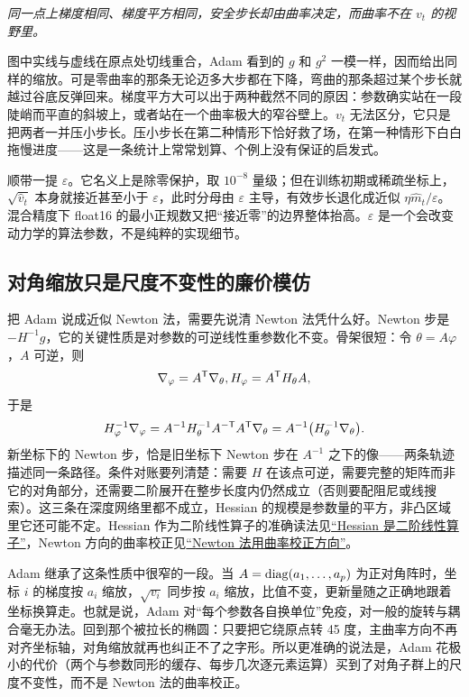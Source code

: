 \emph{同一点上梯度相同、梯度平方相同，安全步长却由曲率决定，而曲率不在 \(v_t\) 的视野里。}

图中实线与虚线在原点处切线重合，Adam 看到的 \(g\) 和 \(g^2\) 一模一样，因而给出同样的缩放。可是零曲率的那条无论迈多大步都在下降，弯曲的那条超过某个步长就越过谷底反弹回来。梯度平方大可以出于两种截然不同的原因：参数确实站在一段陡峭而平直的斜坡上，或者站在一个曲率极大的窄谷壁上。\(v_t\) 无法区分，它只是把两者一并压小步长。压小步长在第二种情形下恰好救了场，在第一种情形下白白拖慢进度——这是一条统计上常常划算、个例上没有保证的启发式。

顺带一提 \(\varepsilon\)。它名义上是除零保护，取 \(10^{-8}\) 量级；但在训练初期或稀疏坐标上，\(\sqrt{\widehat v_t}\) 本身就接近甚至小于 \(\varepsilon\)，此时分母由 \(\varepsilon\) 主导，有效步长退化成近似 \(\eta\widehat m_t/\varepsilon\)。混合精度下 float16 的最小正规数又把``接近零''的边界整体抬高。\(\varepsilon\) 是一个会改变动力学的算法参数，不是纯粹的实现细节。

\subsection{对角缩放只是尺度不变性的廉价模仿}

把 Adam 说成近似 Newton 法，需要先说清 Newton 法凭什么好。Newton 步是 \(-H^{-1}g\)，它的关键性质是对参数的可逆线性重参数化不变。骨架很短：令 \(\theta=A\varphi\)，\(A\) 可逆，则
\[
\nabla_\varphi=A^{\mathsf{T}}\nabla_\theta,\space
H_\varphi=A^{\mathsf{T}}H_\theta A,
\]
于是
\[
H_\varphi^{-1}\nabla_\varphi=A^{-1}H_\theta^{-1}A^{-\mathsf{T}}A^{\mathsf{T}}\nabla_\theta=A^{-1}\bigl(H_\theta^{-1}\nabla_\theta\bigr).
\]
新坐标下的 Newton 步，恰是旧坐标下 Newton 步在 \(A^{-1}\) 之下的像——两条轨迹描述同一条路径。条件对账要列清楚：需要 \(H\) 在该点可逆，需要完整的矩阵而非它的对角部分，还需要二阶展开在整步长度内仍然成立（否则要配阻尼或线搜索）。这三条在深度网络里都不成立，Hessian 的规模是参数量的平方，非凸区域里它还可能不定。Hessian 作为二阶线性算子的准确读法见\hyperref[sec:10-Matrix-Calculus/02-Differentials/03]{``Hessian 是二阶线性算子''}，Newton 方向的曲率校正见\hyperref[sec:09-Convex-Optimization/06-Optimization-Algorithms/02]{``Newton 法用曲率校正方向''}。

Adam 继承了这条性质中很窄的一段。当 \(A=\operatorname{diag}(a_1,\dots,a_p)\) 为正对角阵时，坐标 \(i\) 的梯度按 \(a_i\) 缩放，\(\sqrt{v_i}\) 同步按 \(a_i\) 缩放，比值不变，更新量随之正确地跟着坐标换算走。也就是说，Adam 对``每个参数各自换单位''免疫，对一般的旋转与耦合毫无办法。回到那个被拉长的椭圆：只要把它绕原点转 45 度，主曲率方向不再对齐坐标轴，对角缩放就再也纠正不了之字形。所以更准确的说法是，Adam 花极小的代价（两个与参数同形的缓存、每步几次逐元素运算）买到了对角子群上的尺度不变性，而不是 Newton 法的曲率校正。

